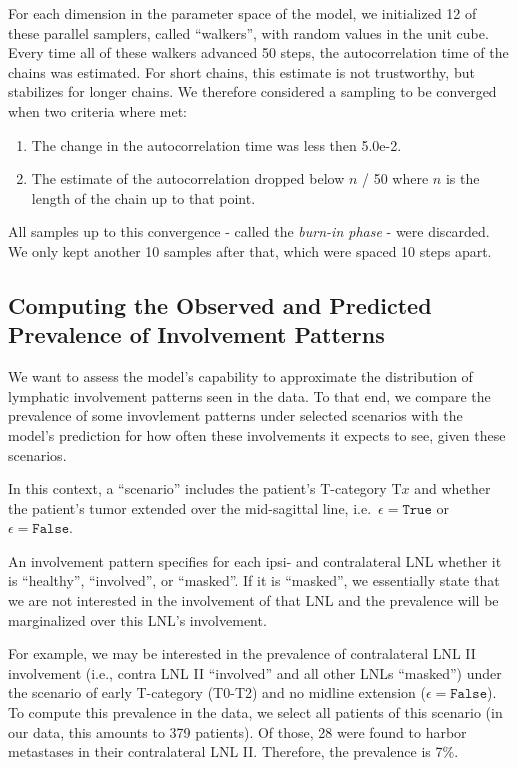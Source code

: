 \documentclass[
  sn-mathphys-num,
]{sn-jnl}
\providecommand{\tightlist}{%
  \setlength{\itemsep}{0pt}\setlength{\parskip}{0pt}}\usepackage{longtable,booktabs,array}
\begin{document}
For each dimension in the parameter space of the model, we initialized
12 of these parallel samplers, called ``walkers'', with random values in
the unit cube. Every time all of these walkers advanced 50 steps, the
autocorrelation time of the chains was estimated. For short chains, this
estimate is not trustworthy, but stabilizes for longer chains. We
therefore considered a sampling to be converged when two criteria where
met:

\begin{enumerate}
\def\labelenumi{\arabic{enumi}.}
\tightlist
\item
  The change in the autocorrelation time was less then 5.0e-2.
\item
  The estimate of the autocorrelation dropped below \(n\) / 50 where
  \(n\) is the length of the chain up to that point.
\end{enumerate}

All samples up to this convergence - called the \emph{burn-in phase} -
were discarded. We only kept another 10 samples after that, which were
spaced 10 steps apart.

\subsection{Computing the Observed and Predicted Prevalence of
Involvement Patterns}\label{sec-prevalence}

We want to assess the model's capability to approximate the distribution
of lymphatic involvement patterns seen in the data. To that end, we
compare the prevalence of some invovlement patterns under selected
scenarios with the model's prediction for how often these involvements
it expects to see, given these scenarios.

In this context, a ``scenario'' includes the patient's T-category
\(\text{T}x\) and whether the patient's tumor extended over the
mid-sagittal line, i.e.~\(\epsilon=\texttt{True}\) or
\(\epsilon=\texttt{False}\).

An involvement pattern specifies for each ipsi- and contralateral LNL
whether it is ``healthy'', ``involved'', or ``masked''. If it is
``masked'', we essentially state that we are not interested in the
involvement of that LNL and the prevalence will be marginalized over
this LNL's involvement.

For example, we may be interested in the prevalence of contralateral LNL
II involvement (i.e., contra LNL II ``involved'' and all other LNLs
``masked'') under the scenario of early T-category (T0-T2) and no
midline extension (\(\epsilon=\texttt{False}\)). To compute this
prevalence in the data, we select all patients of this scenario (in our
data, this amounts to 379 patients). Of those, 28 were found to harbor
metastases in their contralateral LNL II. Therefore, the prevalence is
7\%.
\end{document}
